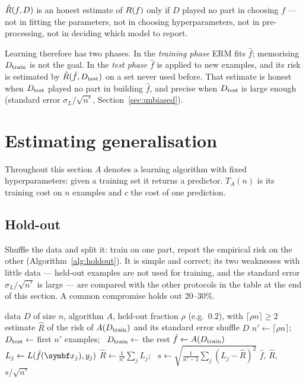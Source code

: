 \documentclass[11pt]{article}
\begin{document}
\begin{keyidea}
$\hat R(f, D)$ is an honest estimate of $R(f)$ only if $D$ played no part in choosing $f$ --- not in fitting the
parameters, not in choosing hyperparameters, not in pre-processing, not in deciding which model to report.
\end{keyidea}

Learning therefore has two phases. In the \emph{training phase} ERM fits $\hat f$; memorising $D_{\mathrm{train}}$ is not the
goal. In the \emph{test phase} $\hat f$ is applied to new examples, and its risk is estimated by
$\hat R(\hat f, D_{\mathrm{test}})$ on a set never used before. That estimate is honest when $D_{\mathrm{test}}$ played no part in
building $\hat f$, and precise when $D_{\mathrm{test}}$ is large enough (standard error $\sigma_L/\sqrt{n'}$,
Section~\ref{sec:unbiased}).

\section{Estimating generalisation}\label{sec:estimating}

Throughout this section $A$ denotes a learning algorithm with fixed hyperparameters: given a training set it returns
a predictor. $T_A(n)$ is its training cost on $n$ examples and $c$ the cost of one prediction.

\subsection{Hold-out}

Shuffle the data and split it: train on one part, report the empirical risk on the other
(Algorithm~\ref{alg:holdout}). It is simple and correct; its two weaknesses with little data --- held-out examples are
not used for training, and the standard error $\sigma_L/\sqrt{n'}$ is large --- are compared with the other protocols
in the table at the end of this section. A common compromise holds out 20--30\%.

\begin{algorithm}[htbp]\small
\caption{Hold-out evaluation}
\label{alg:holdout}
\begin{algorithmic}[1]
\Require data $D$ of size $n$, algorithm $A$, held-out fraction $\rho$ (e.g.\ $0.2$), with $\lceil \rho n \rceil \ge 2$
\Ensure estimate $\hat R$ of the risk of $A(D_{\mathrm{train}})$ and its standard error
  \State shuffle $D$ 
  \State $n' \gets \lceil \rho n \rceil$; \ $D_{\mathrm{test}} \gets$ first $n'$ examples; \ $D_{\mathrm{train}} \gets$ the rest
  \State $\hat f \gets A(D_{\mathrm{train}})$
   \State $L_j \gets L(\hat f(\x_j), y_j)$  \EndFor
  \State $\hat R \gets \frac{1}{n'} \sum_j L_j$; \ $s \gets \sqrt{\frac{1}{n'-1}\sum_j (L_j - \hat R)^2}$
  \State \Return $\hat f$, $\hat R$, $s/\sqrt{n'}$
\EndFunction
\end{algorithmic}
\end{algorithm}
\end{document}
